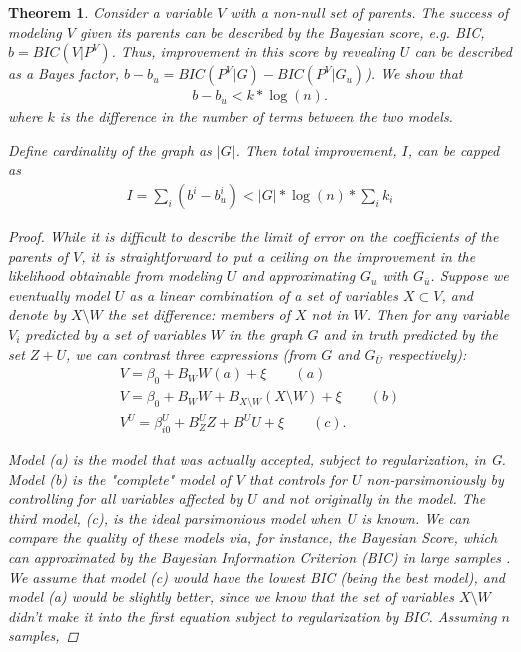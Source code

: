 \documentclass{article}
\newtheorem{theorem}{Theorem}
\begin{document}
\begin{theorem}
\label{thm:ceilingTheorem}
Consider a variable $V$ with a non-null set of parents.  The success of modeling $V$ given its parents can be described by the Bayesian score, e.g. BIC, $b = BIC(V|P^V)$.  Thus, improvement in this score by revealing $U$ can be described as a Bayes factor, $b - b_u = BIC(P^V|G) - BIC(P^V|G_u)$).  We show that 
\begin{align}
b - b_u < k * \log(n).
\end{align}
where $k$ is the difference in the number of terms between the two models.

Define cardinality of the graph as $|G|$.  Then total improvement, $I$, can be capped as
\begin{align}
I = \sum_i (b^i - b^i_u) < |G| * \log(n) * \sum_i k_i
\end{align}
\begin{proof} 
While it is difficult to describe the limit of error on the coefficients of the parents of $V$, it is straightforward to put a ceiling on the improvement in the likelihood obtainable from modeling $U$ and approximating $G_u$ with $G_{\bar{u}}$.  Suppose we eventually model $U$ as a linear combination of a set of variables $X \subset V$, and denote by $X \setminus W$ the set difference: members of $X$ not in $W$.  Then for any variable $V_i$ predicted by a set of variables $W$ in the graph $G$ and in truth predicted by the set $Z + U$, we can contrast three expressions (from $G$ and $G_{\bar{U}}$ respectively):
\begin{equation}
\begin{split}
V = \beta_{0} + B_W W (a) + \xi \qquad (a)\\
V = \beta_{0} + B_W W + B_{X \setminus W} (X \setminus W)
 + \xi \qquad (b)\\
V^U = \beta_{i0}^U + B_Z^U Z + B^U U + \xi \qquad (c).
\end{split}
\end{equation}

Model (a) is the model that was actually accepted, subject to regularization, in G.  Model (b) is the "complete" model of $V$ that controls for $U$ non-parsimoniously by controlling for all variables affected by $U$ and not originally in the model.  The third model, (c), is the ideal parsimonious model when U is known.  We can compare the quality of these models via, for instance, the Bayesian Score, which can approximated by the Bayesian Information Criterion (BIC) in large samples \cite{koller_probabilistic_2009}.  We assume that model (c) would have the lowest BIC (being the best model), and model (a) would be slightly better, since we know that the set of variables $X \setminus W$ didn't make it into the first equation subject to regularization by BIC.  Assuming $n$ samples,


\end{proof}
\end{theorem}
\end{document}
